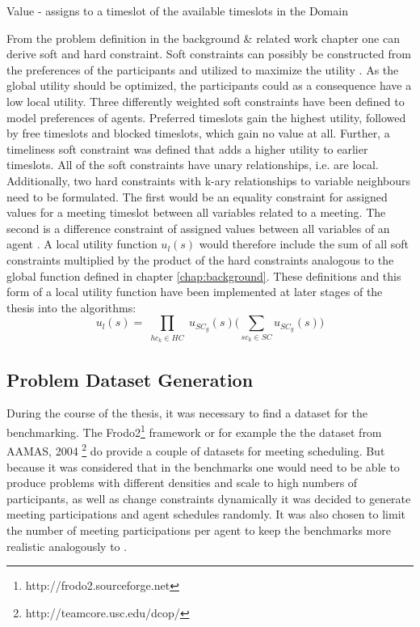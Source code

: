 \begin{hardconstraint2}
Value - assigns to a timeslot of the available timeslots in the Domain
\end{hardconstraint2}
From the problem definition in the background \& related work chapter one can derive soft and hard constraint. Soft constraints can possibly be constructed from the preferences of the participants and utilized to maximize the utility \cite{Franzin}. As the global utility should be optimized, the participants could as a consequence have a low local utility. Three differently weighted soft constraints have been defined to model preferences of agents. Preferred timeslots gain the highest utility, followed by free timeslots and blocked timeslots, which gain no value at all. Further, a timeliness soft constraint was defined that adds a higher utility to earlier timeslots. All of the soft constraints have unary relationships, i.e. are local. %
Additionally, two hard constraints with k-ary relationships to variable neighbours need to be formulated. The first would be an equality constraint for assigned values for a meeting timeslot between all variables related to a meeting. The second is a difference constraint of assigned values between all variables of an agent \cite{Farinelli, Angulo}.
\newline\newline
A local utility function \(u_{l}(s)\) would therefore include the sum of all soft constraints multiplied by the product of the hard constraints analogous to the global function defined in chapter {\ref{chap:background}}. These definitions and this form of a local utility function have been implemented at later stages of the thesis into the algorithms:
\[ u_{l}(s) = \prod_{\substack{hc_{k} \in HC}} u_{SC_{g}}(s) \bigg( \sum_{sc_{k} \in SC} u_{SC_{g}}(s) \bigg)\] 

\subsection{Problem Dataset Generation}

During the course of the thesis, it was necessary to find a dataset for the benchmarking. The Frodo2\footnote{http://frodo2.sourceforge.net} framework or for example the the dataset from AAMAS, 2004 \footnote{http://teamcore.usc.edu/dcop/} do provide a couple of datasets for meeting scheduling. But because it was considered that in the benchmarks one would need to be able to produce problems with different densities and scale to high numbers of participants, as well as change constraints dynamically it was decided to generate meeting participations and agent schedules randomly. It was also chosen to limit the number of meeting participations per agent to keep the benchmarks more realistic analogously to \cite{Chun}.

